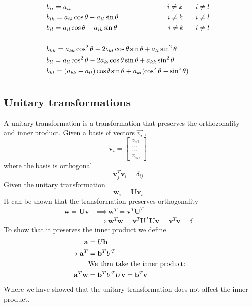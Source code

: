 \documentclass[%
reprint,
amsmath,amssymb,
aps,
]{revtex4-1}
\begin{document}
\begin{align*}
&b_{ii} = a_{ii} \hspace{49mm} i\not=k & i\not=l\\
&b_{ik} = a_{ik}\cos\theta -a_{il}\sin\theta \hspace{25mm} i\not=k & i\not=l \\
&b_{il}  = a_{il}\cos\theta -a_{ik}\sin\theta \hspace{26mm} i\not=k & i\not=l\\ &&\\
&b_{kk} = a_{kk}\cos^2\theta -2a_{kl}\cos\theta\sin\theta +a_{ll}\sin^2\theta&\\
&b_{ll} = a_{ll}\cos^2\theta -2a_{kl}\cos\theta\sin\theta +a_{kk}\sin^2\theta& \\
&b_{kl} = (a_{kk}-a_{ll})\cos\theta\sin\theta+a_{kl}(\cos^2\theta -\sin^2\theta)& \\
\end{align*}\begin{equation}
	\label{jacobimethod}
\end{equation}



\subsection{Unitary transformations} \noindent 
A unitary transformation is a transformation that preserves the orthogonality and inner product. Given a basis of vectors $\vec{v_i}$ ,
\begin{equation*}
	\mathbf{v}_i = \begin{bmatrix} v_{i1} \\ \dots \\ \dots \\v_{in} \end{bmatrix}
\end{equation*}
where the basis is orthogonal 
\begin{equation*}
	\mathbf{v}_j^T\mathbf{v}_i = \delta_{ij}
\end{equation*}
Given the unitary transformation 
\begin{equation*}
	\mathbf{w}_i=\mathbf{U}\mathbf{v}_i
\end{equation*}
It can be shown that the transformation preserves orthogonality
\begin{align*}
	\mathbf{w}=\mathbf{U}\mathbf{v} &\implies \mathbf{w}^T=\mathbf{v}^T\mathbf{U}^T \\ &\implies \mathbf{w}^T\mathbf{w} = \mathbf{v}^T\mathbf{U}^T\mathbf{U}\mathbf{v} = \mathbf{v}^T\mathbf{v} = \delta
\end{align*}
To show that it preserves the inner product we define 
\begin{align*}
	\mathbf{a} &= U\mathbf{b} \\
	\rightarrow \mathbf{a}^T &= \mathbf{b}^TU^T \\
	&\textnormal{We then take the inner product:} \\
	 \mathbf{a}^T\mathbf{w} &= \mathbf{b}^TU^TU\mathbf{v} = \mathbf{b}^T\mathbf{v}
\end{align*}
Where we have showed that the unitary transformation does not affect the inner product. 
\end{document}
